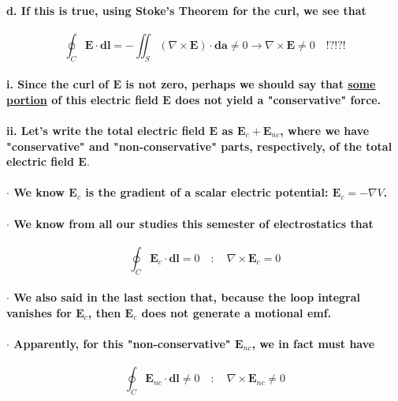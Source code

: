 \documentclass{article}
\begin{document}
\paragraph{\indent d. If this is true, using Stoke's Theorem for the curl, we see that}
\begin{equation*}
    \oint_C\boldsymbol{E}\cdot\boldsymbol{dl}=-\iint_S(\nabla\times\boldsymbol{E})\cdot\boldsymbol{da}\neq 0\rightarrow \nabla\times\boldsymbol{E}\neq 0 \quad\text{!?!?!}
\end{equation*}
\paragraph{\indent\indent i. Since the curl of $\boldsymbol{E}$ is not zero, perhaps we should say that \underline{some portion} of this electric field $\boldsymbol{E}$ does not yield a "conservative" force.}
\paragraph{\indent\indent ii. Let's write the total electric field $\boldsymbol{E}$ as $\boldsymbol{E}_c+\boldsymbol{E}_{nc}$, where we have "conservative" and "non-conservative" parts, respectively, of the total electric field $\boldsymbol{E}.$}
\paragraph{\indent\indent $\cdot$ We know $\boldsymbol{E}_c$ is the gradient of a scalar electric potential: $\boldsymbol{E}_c=-\nabla V$.}
\paragraph{\indent\indent $\cdot$ We know from all our studies this semester of electrostatics that}
\begin{equation*}
    \oint_C\boldsymbol{E}_c\cdot\boldsymbol{dl}=0\quad:\quad \nabla\times\boldsymbol{E}_c=0
\end{equation*}
\paragraph{\indent\indent $\cdot$ We also said in the last section that, because the loop integral vanishes for $\boldsymbol{E}_c$, then $\boldsymbol{E}_c$ does not generate a motional emf.}
\paragraph{\indent\indent $\cdot$ Apparently, for this "non-conservative" $\boldsymbol{E}_{nc}$, we in fact must have}
\begin{equation*}
    \oint_C\boldsymbol{E}_{nc}\cdot\boldsymbol{dl}\neq 0\quad:\quad \nabla\times\boldsymbol{E}_{nc}\neq 0
\end{equation*}
\end{document}
